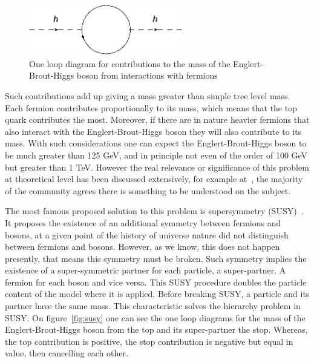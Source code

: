 \begin{figure}[!Hhtbp]
  \begin{center}
    \includegraphics[width=0.6\textwidth]{figs/HierarchyLoop.png}
    \caption{One loop diagram for contributions to the mass of the Englert-Brout-Higgs boson from interactions with fermions}
    \label{fig:oneloophiggs}
  \end{center}
\end{figure}

Such contributions add up giving a mass greater than simple tree level mass. Each fermion contributes proportionally to its mass, which means that the top quark contributes the most. Moreover, if there are in nature heavier fermions that also interact with the Englert-Brout-Higgs boson they will also contribute to its mass. With such considerations one can expect the Englert-Brout-Higgs boson to be much greater than 125 GeV, and in principle not even of the order of 100 GeV but greater than 1 TeV. However the real relevance or significance of this problem at theoretical level has been discussed extensively, for example at~\cite{Jegerlehner:2013nna}, the majority of the community agrees there is something to be understood on the subject. 

The most famous proposed solution to this problem is supersymmetry (SUSY)~\cite{Martin:1997ns}. It proposes the existence of an additional symmetry between fermions and bosons, at a given point of the history of universe nature did not distinguish between fermions and bosons. However, as we know, this does not happen presently, that means this symmetry must be broken. Such symmetry implies the existence of a super-symmetric partner for each particle, a super-partner. A fermion for each boson and vice versa. This SUSY procedure doubles the particle content of the model where it is applied. Before breaking SUSY, a particle and its partner have the same mass. This characteristic solves the hierarchy problem in SUSY. On figure~\ref{fig:susy} one can see the one loop diagrams for the mass of the Englert-Brout-Higgs boson from the top and its super-partner the stop. Whereas, the top contribution is positive, the stop contribution is negative but equal in value, then cancelling each other.


